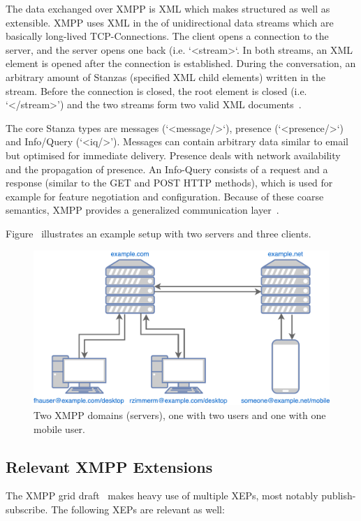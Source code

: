 The data exchanged over XMPP is XML which makes structured as well as extensible. XMPP uses XML in the of unidirectional data streams which are basically long-lived TCP-Connections. The client opens a connection to the server, and the server opens one back (i.e. `<stream>`. In both streams, an XML element is opened after the connection is established. During the conversation, an arbitrary amount of Stanzas (specified XML child elements) written in the stream. Before the connection is closed, the root element is closed (i.e. `</stream>') and the two streams form two valid XML documents~\cite{rfc6120}\cite{professional-xmpp}.

The core Stanza types are messages (`<message/>`), presence (`<presence/>`) and Info/Query (`<iq/>'). Messages can contain arbitrary data similar to email but optimised for immediate delivery. Presence deals with network availability and the propagation of presence. An Info-Query consists of a request and a response (similar to the GET and POST HTTP methods), which is used for example for feature negotiation and configuration. Because of these coarse semantics, XMPP provides a generalized communication layer~\cite{rfc6120}\cite{ieee-xplore-stream-xml-xmpp}.

Figure~ illustrates an example setup with two servers and three clients.

\begin{figure}[h]
	\centering
	\includegraphics[width=0.8\linewidth]{resources/xmpp_overview.pdf}
	\caption{Two XMPP domains (servers), one with two users and one with one mobile user.}
	\label{fig:xmpp-overview}
\end{figure}

\subsection{Relevant XMPP Extensions}

The XMPP grid draft~\cite{ietf-mile-xmpp-grid-05} makes heavy use of multiple XEPs, most notably publish-subscribe. The following XEPs are relevant as well:

